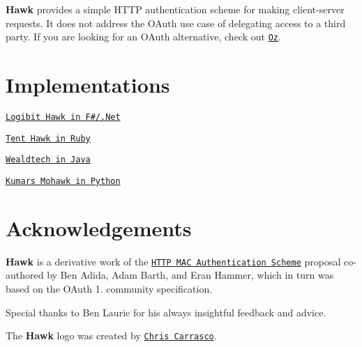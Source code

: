 {\bfseries Hawk} provides a simple H\+T\+TP authentication scheme for making client-\/server requests. It does not address the O\+Auth use case of delegating access to a third party. If you are looking for an O\+Auth alternative, check out \href{https://github.com/hueniverse/oz}{\tt Oz}.

\section*{Implementations}


\begin{DoxyItemize}
\item \href{https://github.com/logibit/logibit.hawk/}{\tt Logibit Hawk in F\#/.Net}
\item \href{https://github.com/tent/hawk-ruby}{\tt Tent Hawk in Ruby}
\item \href{https://github.com/wealdtech/hawk}{\tt Wealdtech in Java}
\item \href{https://github.com/kumar303/mohawk/}{\tt Kumar\textquotesingle{}s Mohawk in Python}
\end{DoxyItemize}

\section*{Acknowledgements}

{\bfseries Hawk} is a derivative work of the \href{http://tools.ietf.org/html/draft-hammer-oauth-v2-mac-token-05}{\tt H\+T\+TP M\+AC Authentication Scheme} proposal co-\/authored by Ben Adida, Adam Barth, and Eran Hammer, which in turn was based on the O\+Auth 1. community specification.

Special thanks to Ben Laurie for his always insightful feedback and advice.

The {\bfseries Hawk} logo was created by \href{http://chriscarrasco.com}{\tt Chris Carrasco}. 